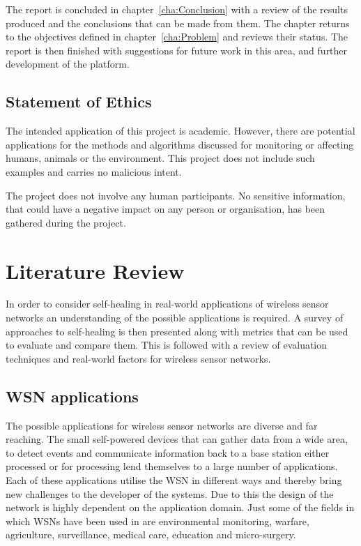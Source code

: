 \documentclass[authoryearcitations]{UoYCSproject}
\begin{document}
The report is concluded in chapter~\ref{cha:Conclusion} with a review of the results produced and the conclusions that can be made from them. The chapter returns to the objectives defined in chapter~\ref{cha:Problem} and reviews their status. The report is then finished with suggestions for future work in this area, and further development of the platform.

\section{Statement of Ethics}

The intended application of this project is academic. However, there are potential applications for the methods and algorithms discussed for monitoring or affecting humans, animals or the environment. This project does not include such examples and carries no malicious intent.

The project does not involve any human participants. No sensitive information, that could have a negative impact on any person or organisation, has been gathered during the project.

\chapter{Literature Review}
\label{cha:LitReview}


In order to consider self-healing in real-world applications of wireless sensor networks an understanding of the possible applications is required. A survey of approaches to self-healing is then presented along with metrics that can be used to evaluate and compare them. This is followed with a review of evaluation techniques and real-world factors for wireless sensor networks.

\section{WSN applications}


The possible applications for wireless sensor networks are diverse and far reaching. The small self-powered devices that can gather data from a wide area, to detect events and communicate information back to a base station either processed or for processing lend themselves to a large number of applications. Each of these applications utilise the WSN in different ways and thereby bring new challenges to the developer of the systems. Due to this the design of the network is highly dependent on the application domain. Just some of the fields in which WSNs have been used in are environmental monitoring, warfare, agriculture, surveillance, medical care, education and micro-surgery.
\end{document}
